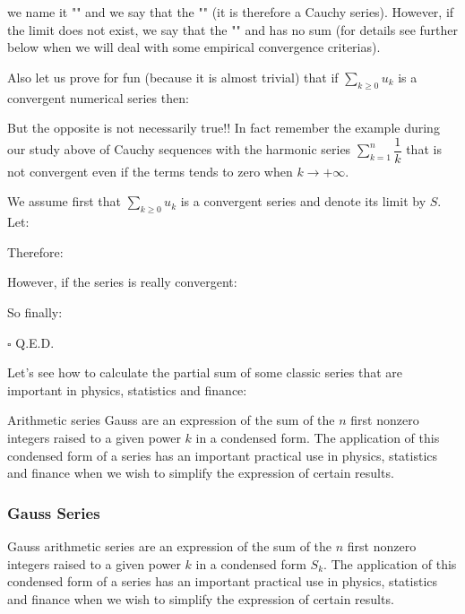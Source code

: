 	we name it "" and we say that the "" (it is therefore a  Cauchy series). However, if the limit does not exist, we say that the "" and has no sum (for details see further below when we will deal with some empirical convergence criterias).
	\begin{theorem}
		Also let us prove for fun (because it is almost trivial) that if $\displaystyle \sum_{k\geq 0} u_k $ is a convergent numerical series then:
		
		But the opposite is not necessarily true!! In fact remember the example during our study above of Cauchy sequences with the harmonic series $\sum_{k=1}^n \dfrac{1}{k}$ that is not convergent even if the terms tends to zero when $k \rightarrow +\infty$.
		\end{theorem}
	\begin{dem}
		We assume first that $\displaystyle \sum_{k\geq 0} u_k $ is a convergent series and denote its limit by $S$. Let:
		
		Therefore:
		
		However, if the series is really convergent:
		
		So finally:
		
		\begin{flushright}
			$\square$  Q.E.D.
	\end{flushright}
	\end{dem}
	Let's see how to calculate the partial sum of some classic series that are important in physics, statistics and finance:
	
	Arithmetic series Gauss are an expression of the sum of the $n$ first nonzero integers raised to a given power $k$ in a condensed form. The application of this condensed form of a series has an important practical use in physics, statistics and finance when we wish to simplify the expression of certain results.
	
	\subsubsection{Gauss Series}
	
	Gauss arithmetic series are an expression of the sum of the $n$ first nonzero integers raised to a given power $k$ in a condensed form $S_k$. The application of this condensed form of a series has an important practical use in physics, statistics and finance when we wish to simplify the expression of certain results.
	
